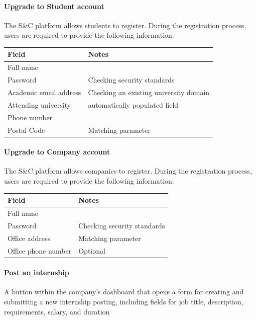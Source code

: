 \paragraph{Upgrade to Student account}
The S\&C platform allows students to register. During the registration process, users are required to provide the following information:
\begin{center}
\renewcommand{\arraystretch}{1}
\begin{tabular}{|p{5cm}|p{5cm}|}
\hline
\textbf{Field}  & \textbf{Notes} \\
\hline
Full name &  \\
\hline
Password & Checking security standards \\
\hline
Academic email address & Checking an existing university domain \\
\hline
Attending university & automatically populated field \\
\hline
Phone number &  \\
\hline
Postal Code & Matching parameter \\
\hline
\end{tabular}
\end{center}

\paragraph{Upgrade to Company account}
The S\&C platform allows companies to register. During the registration process, users are required to provide the following information:
\begin{center}
\renewcommand{\arraystretch}{1}
\begin{tabular}{|p{5cm}|p{5cm}|}
\hline
\textbf{Field} & \textbf{Notes} \\
\hline
Full name &  \\
\hline
Password & Checking security standards \\
\hline
Office address & Matching parameter \\
\hline
Office phone number & Optional \\
\hline
\end{tabular}
\end{center}

\paragraph{Post an internship}A button within the company's dashboard that opens a form for creating and submitting a new internship posting, including fields for job title, description, requirements, salary, and duration

